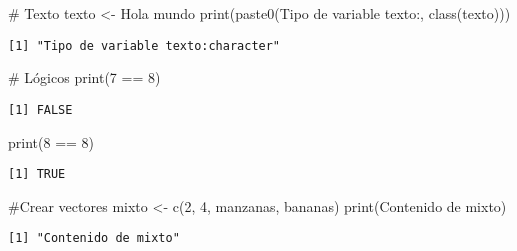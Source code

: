 \documentclass[
  letterpaper,
  DIV=11,
  numbers=noendperiod]{scrartcl}
\newenvironment{Shaded}{\begin{snugshade}}{\end{snugshade}}
\newcommand{\CommentTok}[1]{\textcolor[rgb]{0.37,0.37,0.37}{#1}}
\newcommand{\DecValTok}[1]{\textcolor[rgb]{0.68,0.00,0.00}{#1}}
\newcommand{\FunctionTok}[1]{\textcolor[rgb]{0.28,0.35,0.67}{#1}}
\newcommand{\NormalTok}[1]{\textcolor[rgb]{0.00,0.23,0.31}{#1}}
\newcommand{\OtherTok}[1]{\textcolor[rgb]{0.00,0.23,0.31}{#1}}
\newcommand{\SpecialCharTok}[1]{\textcolor[rgb]{0.37,0.37,0.37}{#1}}
\newcommand{\StringTok}[1]{\textcolor[rgb]{0.13,0.47,0.30}{#1}}
\begin{document}
\begin{Shaded}
\begin{Highlighting}[]
\CommentTok{\# Texto}
\NormalTok{texto }\OtherTok{\textless{}{-}} \StringTok{\textquotesingle{}Hola mundo\textquotesingle{}}
\FunctionTok{print}\NormalTok{(}\FunctionTok{paste0}\NormalTok{(}\StringTok{\textquotesingle{}Tipo de variable texto:\textquotesingle{}}\NormalTok{, }\FunctionTok{class}\NormalTok{(texto)))}
\end{Highlighting}
\end{Shaded}

\begin{verbatim}
[1] "Tipo de variable texto:character"
\end{verbatim}

\begin{Shaded}
\begin{Highlighting}[]
\CommentTok{\# Lógicos}
\FunctionTok{print}\NormalTok{(}\DecValTok{7} \SpecialCharTok{==} \DecValTok{8}\NormalTok{)}
\end{Highlighting}
\end{Shaded}

\begin{verbatim}
[1] FALSE
\end{verbatim}

\begin{Shaded}
\begin{Highlighting}[]
\FunctionTok{print}\NormalTok{(}\DecValTok{8} \SpecialCharTok{==} \DecValTok{8}\NormalTok{)}
\end{Highlighting}
\end{Shaded}

\begin{verbatim}
[1] TRUE
\end{verbatim}

\begin{Shaded}
\begin{Highlighting}[]
\CommentTok{\#Crear vectores}
\NormalTok{mixto }\OtherTok{\textless{}{-}} \FunctionTok{c}\NormalTok{(}\DecValTok{2}\NormalTok{, }\DecValTok{4}\NormalTok{, }\StringTok{\textquotesingle{}manzanas\textquotesingle{}}\NormalTok{, }\StringTok{\textquotesingle{}bananas\textquotesingle{}}\NormalTok{)}
\FunctionTok{print}\NormalTok{(}\StringTok{\textquotesingle{}Contenido de mixto\textquotesingle{}}\NormalTok{)}
\end{Highlighting}
\end{Shaded}

\begin{verbatim}
[1] "Contenido de mixto"
\end{verbatim}
\end{document}
